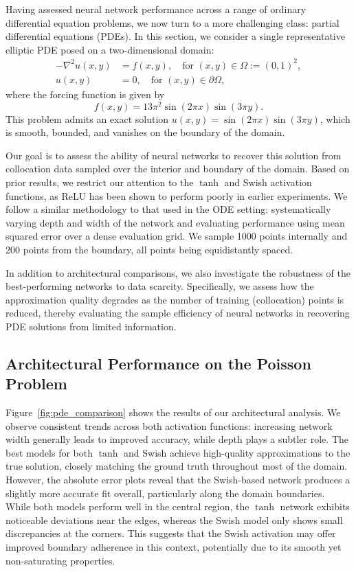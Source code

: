 Having assessed neural network performance across a range of ordinary differential equation problems,
we now turn to a more challenging class: partial differential equations (PDEs). In this section, 
we consider a single representative elliptic PDE posed on a two-dimensional domain:
\[
\begin{aligned}
    -\nabla^2 u(x, y) &= f(x, y), \quad \text{for } (x, y) \in \Omega := (0,1)^2, \\
    u(x, y) &= 0, \quad \text{for } (x, y) \in \partial \Omega,
\end{aligned}
\]
where the forcing function is given by
\[
f(x, y) = 13\pi^2 \sin(2\pi x)\sin(3\pi y).
\]
This problem admits an exact solution \( u(x, y) = \sin(2\pi x)\sin(3\pi y) \), which is smooth, bounded, 
and vanishes on the boundary of the domain.

Our goal is to assess the ability of neural networks to recover this solution from collocation data 
sampled over the interior and boundary of the domain. Based on prior results, we restrict our 
attention to the \(\tanh\) and Swish activation functions, as ReLU has been shown to perform poorly 
in earlier experiments. We follow a similar methodology to that used in the ODE setting: 
systematically varying depth and width of the network and evaluating performance using mean 
squared error over a dense evaluation grid. We sample 1000 points internally and 200 points 
from the boundary, all points being equidistantly spaced.

In addition to architectural comparisons, we also investigate the robustness of the best-performing 
networks to data scarcity. Specifically, we assess how the approximation quality degrades as 
the number of training (collocation) points is reduced, thereby evaluating the sample efficiency 
of neural networks in recovering PDE solutions from limited information.

\subsection{Architectural Performance on the Poisson Problem}

 Figure~\ref{fig:pde_comparison} shows the results of our architectural analysis. We observe
consistent trends across both activation functions: increasing network width generally 
leads to improved accuracy, while depth plays a subtler role. The best models for both $\tanh$ and 
Swish achieve high-quality approximations to the true solution, closely matching the ground truth 
throughout most of the domain. However, the absolute error plots reveal that the Swish-based network 
produces a slightly more accurate fit overall, particularly along the domain boundaries. While both 
models perform well in the central region, the $\tanh$ network exhibits noticeable deviations near the 
edges, whereas the Swish model only shows small discrepancies at the corners. This suggests that the 
Swish activation may offer improved boundary adherence in this context, potentially due to its smooth 
yet non-saturating properties.

